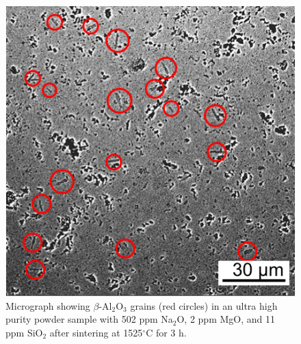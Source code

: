 \newpage
\begin{figure}[H]
	\centering
	\includegraphics{Chapter-5/Figures/Figure11.png}
	\caption{Micrograph showing $\beta$-Al$_{2}$O$_{3}$ grains (red circles) in an ultra high purity powder sample with 502 ppm Na$_{2}$O, 2 ppm MgO, and 11 ppm SiO$_{2}$ after sintering at 1525$^{\circ}$C for 3 h.}
	\label{Ch5-figure:Figure11}
\end{figure}

